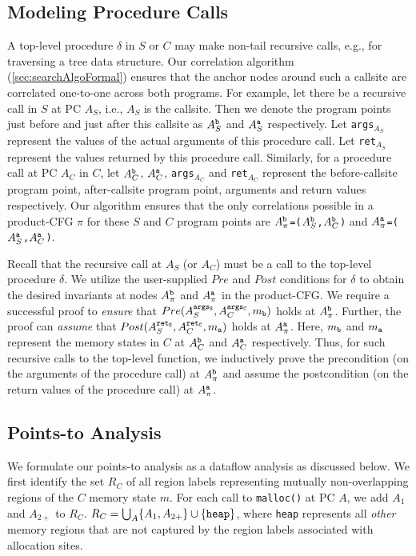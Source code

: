 \subsection{Modeling Procedure Calls}
\label{sec:modelfcalls}
A top-level procedure $\delta$
in $S$ or $C$ may make non-tail recursive
calls, e.g., for traversing
a tree data structure.
Our correlation algorithm (\cref{sec:searchAlgoFormal}) ensures
that the anchor nodes around such a callsite are correlated
one-to-one across both programs. For example, let there be a
recursive call in $S$ at PC $A_S$, i.e., $A_S$ is the callsite.
Then we denote the program points just before and just
after this callsite
as $A^{{\tt b}}_S$ and $A^{{\tt a}}_S$ respectively.
Let {\tt args$_{A_S}$}
represent the values of the
actual arguments of this procedure call.
Let {\tt ret$_{A_S}$} represent the values returned by this procedure call.
Similarly, for a procedure call at PC $A_C$ in $C$, let
$A^{{\tt b}}_C$,
$A^{{\tt a}}_C$,
{\tt args$_{A_C}$} and {\tt ret$_{A_C}$} 
represent the before-callsite program point, after-callsite program point,
arguments and return values respectively.
Our algorithm ensures that the only correlations possible in
a product-CFG $\pi$ for these $S$ and $C$ program points are
{\tt $A_{\pi}^{{\tt b}}$=($A_{S}^{{\tt b}}$,$A_{C}^{{\tt b}}$)}
and
{\tt $A_{\pi}^{{\tt a}}$=($A_{S}^{{\tt a}}$,$A_{C}^{{\tt a}}$)}.

Recall that the recursive call at $A_S$ (or $A_C$) must
be a call to the top-level procedure $\delta$.
We utilize the user-supplied $Pre$ and $Post$ conditions for $\delta$ to obtain
the desired invariants at nodes $A_{\pi}^{{\tt b}}$
and 
$A_{\pi}^{{\tt a}}$ in the product-CFG.
We require a successful proof to
{\em ensure} that {\small $Pre(A^{{\tt args_S}}_S, A^{{\tt args_C}}_C, m_{\tt b})$}
holds at $A_{\pi}^{{\tt b}}$.  Further, the proof can
{\em assume} that {\small $Post(A^{{\tt ret_S}}_S, A^{{\tt ret_C}}_C, m_{\tt a})$} holds
at 
$A_{\pi}^{{\tt a}}$. Here, $m_{\tt b}$
and $m_{\tt a}$ represent the memory states in $C$ at
$A^{{\tt b}}_C$ and
$A^{{\tt a}}_C$ respectively.
Thus, for such recursive calls to the
top-level function, we inductively
prove the precondition (on the
arguments of the procedure call) at $A_{\pi}^{{\tt b}}$
and assume the postcondition (on the return values of the procedure call)
at $A_{\pi}^{{\tt a}}$.


\subsection{Points-to Analysis}
\label{sec:pointsToFormal}
We formulate our points-to analysis as a dataflow analysis as discussed below.
We first identify the set $R_C$ of all region labels representing mutually non-overlapping
regions of the $C$ memory state $m$.
For each call to {\tt malloc()} at PC $A$,
we add $A_1$ and $A_{2+}$ to $R_C$. $R_C=\bigcup_{A}\{A_1,A_{2+}\}\cup\{{\tt heap}\}$,
where {\tt heap} represents all {\em other} memory regions that are not
captured by the region labels associated with allocation sites.


